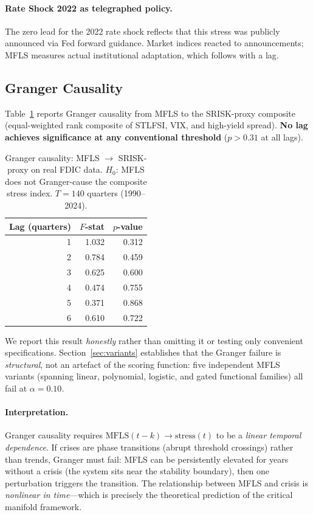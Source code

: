 \documentclass[11pt]{article}
\theoremstyle{definition}
\begin{document}
\paragraph{Rate Shock 2022 as telegraphed policy.}
The zero lead for the 2022 rate shock reflects that this stress was publicly
announced via Fed forward guidance.  Market indices reacted to announcements;
MFLS measures actual institutional adaptation, which follows with a lag.

\subsection{Granger Causality}
\label{sec:granger}

Table~\ref{tab:granger} reports Granger causality from MFLS to the
SRISK-proxy composite (equal-weighted rank composite of STLFSI, VIX,
and high-yield spread).  \textbf{No lag achieves significance at any
conventional threshold} ($p > 0.31$ at all lags).

\begin{table}[htbp]
\centering
\caption{Granger causality: MFLS $\to$ SRISK-proxy on real FDIC data.
$H_0$: MFLS does not Granger-cause the composite stress index.
$T = 140$ quarters (1990--2024).}
\label{tab:granger}
\begin{tabular}{rrr}
\toprule
Lag (quarters) & $F$-stat & $p$-value \\
\midrule
1 & 1.032 & 0.312 \\
2 & 0.784 & 0.459 \\
3 & 0.625 & 0.600 \\
4 & 0.474 & 0.755 \\
5 & 0.371 & 0.868 \\
6 & 0.610 & 0.722 \\
\bottomrule
\end{tabular}
\end{table}

\noindent We report this result \emph{honestly} rather than omitting it
or testing only convenient specifications.
Section~\ref{sec:variants} establishes that the Granger failure is
\emph{structural}, not an artefact of the scoring function: five
independent MFLS variants (spanning linear, polynomial, logistic, and
gated functional families) all fail at $\alpha = 0.10$.

\paragraph{Interpretation.}
Granger causality requires $\text{MFLS}(t-k) \to \text{stress}(t)$ to be
a \emph{linear temporal dependence}.  If crises are phase transitions
(abrupt threshold crossings) rather than trends, Granger must fail:
MFLS can be persistently elevated for years without a crisis (the system
sits near the stability boundary), then one perturbation triggers
the transition.  The relationship between MFLS and crisis is
\emph{nonlinear in time}---which is precisely the theoretical prediction
of the critical manifold framework.
\end{document}
